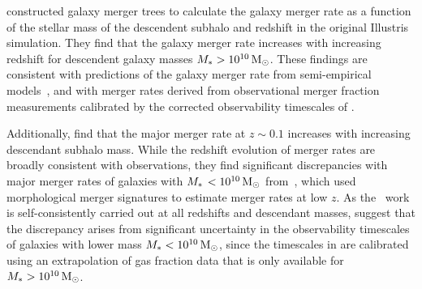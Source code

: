 \documentclass[twocolumn,linenumbers]{aastex631}
\begin{document}
           

            
            \citet{RG2015} constructed galaxy merger trees to calculate the galaxy merger rate as a function of the stellar mass of the descendent subhalo and redshift in the original Illustris simulation. 
            They find that the galaxy merger rate increases with increasing redshift for descendent galaxy masses $M_{*{}}>10^{10}\,\mathrm{M}_\odot$. 
            These findings are consistent with predictions of the galaxy merger rate from semi-empirical models~\citep{Stewart2009,Hopkins2010a}, and with merger rates derived from observational merger fraction measurements calibrated by the corrected observability timescales of \citet{Lotz2011}.
            
            
            Additionally, \citet{RG2015} find that the major merger rate at $z\sim0.1$ increases with increasing descendant subhalo mass.
            While the redshift evolution of merger rates are broadly consistent with observations, they find significant discrepancies with major merger rates of galaxies with $M_{*{\,}} <10^{10}\,\mathrm{M}_\odot$ from~\citet{Casteels2014}, which used morphological merger signatures to estimate merger rates at low $z$. 
            As the~\citet{RG2015} work is self-consistently carried out at all redshifts and descendant masses, \citet{RG2015} suggest that the discrepancy arises from significant uncertainty in the observability timescales of galaxies with lower mass $M_{*{}}<10^{10}\,\mathrm{M}_\odot$, since the timescales in \citet{Casteels2014} are calibrated using an extrapolation of gas fraction data that is only available for $M_{*{}}>10^{10}\,\mathrm{M}_\odot$. 
            
\end{document}
